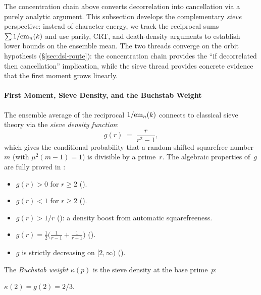 The concentration chain above converts decorrelation into cancellation
via a purely analytic argument.  This subsection develops the
complementary \emph{sieve} perspective: instead of character energy,
we track the reciprocal sums $\sum 1/\mathrm{em}_{n}(k)$ and use parity,
CRT, and death-density arguments to establish lower bounds on the
ensemble mean.  The two threads converge on the orbit hypothesis
(\S\ref{sec:dsl-route}): the concentration chain provides the
``if decorrelated then cancellation'' implication, while the
sieve thread provides concrete evidence that the first moment
grows linearly.

\paragraph{First Moment, Sieve Density, and the Buchstab Weight}
\label{sec:first-moment}

The ensemble average of the reciprocal $1/\mathrm{em}_{n}(k)$
connects to classical sieve theory via the \emph{sieve density
function}:
\[
  g(r) \;=\; \frac{r}{r^2 - 1},
\]
which gives the conditional probability that a random shifted
squarefree number $m$ (with $\mu^2(m{-}1) = 1$) is divisible by a
prime~$r$.  The algebraic properties of~$g$ are fully proved in
:

\begin{itemize}[nosep]
\item $g(r) > 0$ for $r \geq 2$
  ().
\item $g(r) < 1$ for $r \geq 2$
  ().
\item $g(r) > 1/r$
  ():
  a density boost from automatic squarefreeness.
\item $g(r) = \tfrac{1}{2}\bigl(\tfrac{1}{r-1} + \tfrac{1}{r+1}\bigr)$
  ().
\item $g$ is strictly decreasing on $[2, \infty)$
  ().
\end{itemize}

The \emph{Buchstab weight} $\kappa(p)$ is the sieve density at the
base prime~$p$:

\begin{theorem}
$\kappa(2) = g(2) = 2/3$.
\end{theorem}

